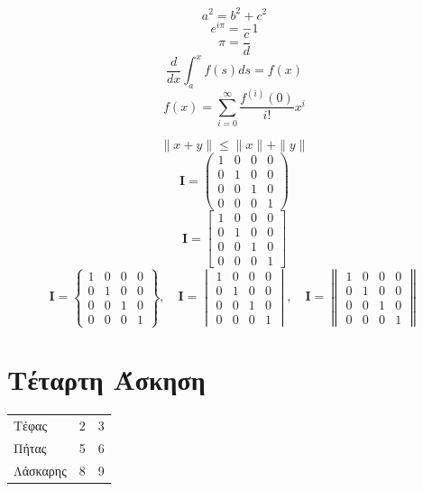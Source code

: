 \documentclass[a4paper,11pt]{article}
\newcommand{\lt}{\latintext}
\begin{document}
$$a^2=b^2+c^2$$
 $$e^{i\pi}=-1$$
$$\pi=\frac{c}{d}$$
$$\frac{d}{dx}\int_{a}^xf(s)ds=f(x)$$
$$f(x)=\sum_{i=0}^\infty \frac{f^{(i)}(0)}{i!}x^i $$
\begin{center}
\lt{  \textbf{Ax=b}}
\end{center}
$$\| x+y \| \le \|x \|+\|y\|$$  
\begin{equation}
\mathbf{I}=\begin{pmatrix} 1 & 0 & 0 & 0\\ 0 & 1 & 0 & 0\\0 & 0 & 1 & 0\\0& 0 &0 &1 \end{pmatrix}
\end{equation}
\begin{equation}
\mathbf{I}=\begin{bmatrix} 1 & 0 & 0 & 0\\ 0 & 1 & 0 & 0\\0 & 0 & 1 & 0\\0& 0 &0 &1  \end{bmatrix}
\end{equation}
\begin{equation}
\mathbf{I}=\begin{Bmatrix}1 & 0 & 0 & 0\\ 0 & 1 & 0 & 0\\0 & 0 & 1 & 0\\0& 0 &0 &1 \end{Bmatrix} ,\quad\mathbf{I}=\begin{vmatrix}  1 & 0 & 0 & 0\\ 0 & 1 & 0 & 0\\0 & 0 & 1 & 0\\0& 0 &0 &1 \end{vmatrix},\quad\mathbf{I}=\begin{Vmatrix} 1 & 0 & 0 & 0\\ 0 & 1 & 0 & 0\\0 & 0 & 1 & 0\\0& 0 &0 &1 \end{Vmatrix} 
\end{equation}

\section{Τέταρτη Άσκηση}


\begin{center}
  \begin{tabular}{  l  c  r }
    Τέφας & 2 & 3 \\ 
    Πήτας & 5 & 6 \\ 
    Λάσκαρης & 8 & 9 \\
  \end{tabular}
\end{center} 
\bigskip
\end{document}
